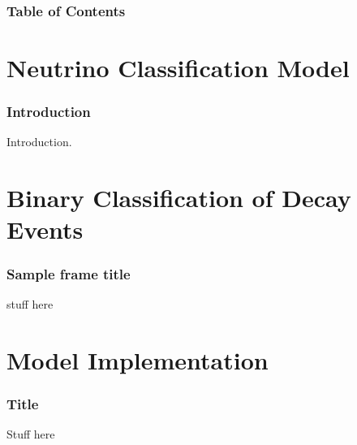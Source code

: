 \documentclass{beamer}
\title{\subtitle{Binary Classification Model for Decay Events}}
\author{Prince Bhaura, Yijie Wang, Murdock Aubry}
\institute{University of Toronto}
\date{PHY479 2023}
\begin{document}
\frame{\titlepage}

\begin{frame}
	\frametitle{Table of Contents}
	\tableofcontents
\end{frame}





\section{Neutrino Classification Model}

\begin{frame}
	\frametitle{Introduction}
		Introduction.
	\end{frame}



\section{Binary Classification of Decay Events}

\begin{frame}
\frametitle{Sample frame title}
	stuff here
\end{frame}



\section{Model Implementation}

\begin{frame}
\frametitle{Title}
	Stuff here
\end{frame}
\end{document}
